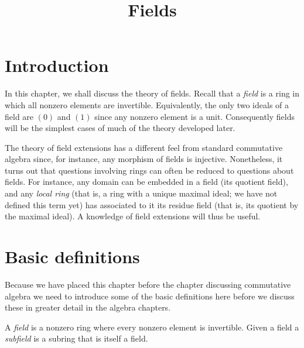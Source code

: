 

%


\title{Fields}


\maketitle

\label{section-phantom}

\tableofcontents


\section{Introduction}
\label{section-introduction}

\noindent
In this chapter, we shall discuss the theory of fields. Recall that a
{\it field} is a ring in which all nonzero elements are invertible.
Equivalently, the only two ideals of a field are $(0)$ and $(1)$
since any nonzero element is a unit. Consequently fields will be the
simplest cases of much of the theory developed later.

\medskip\noindent
The theory of field extensions has a different feel from standard commutative
algebra since, for instance, any morphism of fields is injective. Nonetheless,
it turns out that questions involving rings can often be reduced to questions
about fields. For instance, any domain can be embedded in a field
(its quotient field), and any {\it local ring} (that is, a ring with a unique
maximal ideal; we have not defined this term yet) has associated to it its
residue field (that is, its quotient by the maximal ideal).
A knowledge of field extensions will thus be useful.




\section{Basic definitions}
\label{section-definitions}

\noindent
Because we have placed this chapter before the chapter discussing
commutative algebra we need to introduce some of the basic definitions
here before we discuss these in greater detail in the algebra chapters.

\begin{definition}
\label{definition-field}
A {\it field} is a nonzero ring where every nonzero element is invertible.
Given a field a {\it subfield} is a subring that is itself a field.
\end{definition}

